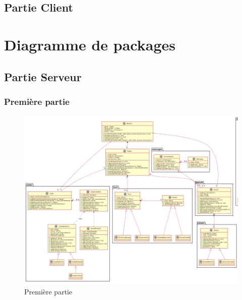         
    \pagebreak
	\subsection{Partie Client}

    \newpage
\section{Diagramme de packages}
	\subsection{Partie Serveur}
		\subsubsection{Première partie}
			\vspace{10mm}
			\begin{figure}[!h]
				\centering
				\includegraphics[angle=90,width=150mm]{images/DP1.png}
				\caption{Première partie}
			\end{figure}

		\newpage

